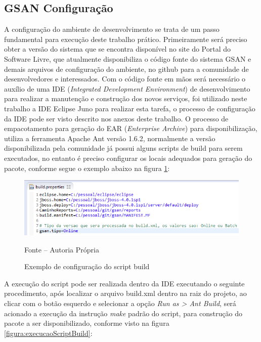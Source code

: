\subsection{GSAN Configuração}
A configuração do ambiente de desenvolvimento se trata de um passo fundamental para execução deste trabalho prático. Primeiramente será preciso obter a versão do sistema que se encontra disponível no site do Portal do Software Livre, que atualmente disponibiliza o código fonte do sistema GSAN e demais arquivos de configuração do ambiente, no github para a comunidade de desenvolvedores e interessados.  Com o código fonte em mãos será necessário o auxílio de uma IDE (\textit{Integrated Development Environment}) de desenvolvimento para realizar a manutenção e construção dos novos serviços, foi utilizado neste trabalho a IDE Eclipse Juno para realizar esta tarefa, o processo de configuração da IDE pode ser visto descrito nos anexos deste trabalho.
O processo de empacotamento para geração do EAR (\textit{Enterprise Archive}) para disponibilização, utiliza a ferramenta Apache Ant versão 1.6.2, normalmente a versão disponibilizada pela comunidade já possui alguns scripts de build para serem executados, no entanto é preciso configurar os locais adequados para geração do pacote, conforme segue o exemplo abaixo na figura \ref{figura:configuracaoScriptBuild}:


\begin{figure}[H]
	\centering
	\includegraphics{figuras/build_properties.png}
	\caption{Exemplo de configuração do script build}
	\label{figura:configuracaoScriptBuild}	
	Fonte – Autoria Própria
\end{figure}
	
A execução do script pode ser realizada dentro da IDE executando o seguinte procedimento, após localizar o arquivo build.xml dentro na raiz do projeto, ao clicar com o botão esquerdo e selecionar a opção \textit{Run as > Ant Build}, será acionado a execução da instrução \textit{make} padrão do script, para construção do pacote a ser disponibilizado, conforme visto na figura \ref{figura:execucaoScriptBuild}:	
		
